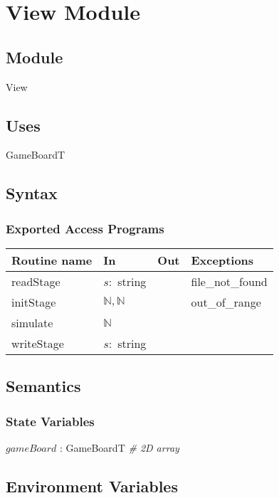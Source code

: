 \documentclass[12pt]{article}
\begin{document}
\section* {View Module}

\subsection*{Module}

View

\subsection* {Uses}

\noindent GameBoardT

\subsection* {Syntax}

\subsubsection* {Exported Access Programs}

\begin{tabular}{| l | l | l | l |}
\hline
\textbf{Routine name} & \textbf{In} & \textbf{Out} & \textbf{Exceptions}\\
\hline
readStage  & $s:$ string & & file\_not\_found\\
\hline
initStage  & $\mathbb{N}, \mathbb{N}$ & & out\_of\_range\\
\hline
simulate & $\mathbb{N}$ & & \\
\hline
writeStage & $s:$ string & & \\
\hline
\end{tabular}

\subsection* {Semantics}

\subsubsection* {State Variables}

$gameBoard$ : GameBoardT \textit{\# 2D array}

\subsection* {Environment Variables}
\end{document}
